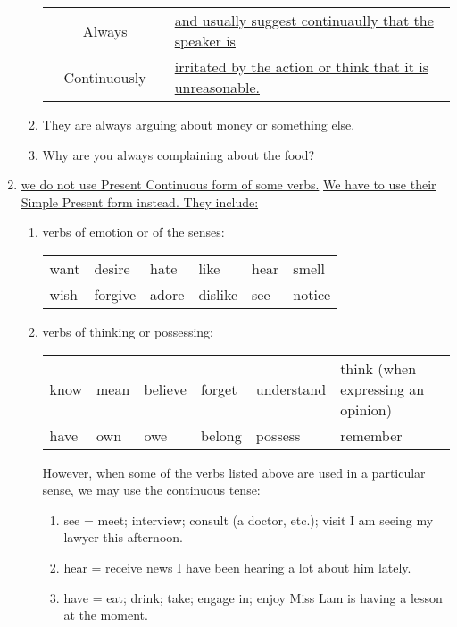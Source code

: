 \begin{enumerate}
\begin{enumerate}
\begin{tabular}{cccl}
                    & Always       & & \underline{and usually suggest continuaully that the speaker is} \\
                    & Continuously & & \underline{irritated by the action or think that it is unreasonable.}
                \end{tabular}
            \item They are always arguing about money or something else.
            \item Why are you always complaining about the food?
        \end{enumerate}
    \item \underline{we do not use Present Continuous form of some verbs.} \newline
        \underline{We have to use their Simple Present form instead. They include:}
        \begin{enumerate}
            \item verbs of emotion or of the senses: \newline
                \begin{tabular}{llllll}
                    want & desire & hate & like & hear & smell \\
                    wish & forgive & adore & dislike & see & notice
                \end{tabular}
            \item verbs of thinking or possessing: \newline
                \begin{tabular}{llllll}
                    know & mean & believe & forget & understand & think (when expressing an opinion)\\
                    have & own & owe & belong & possess & remember
                \end{tabular} \newline
                However, when some of the verbs listed above are used in a
                particular sense, we may use the continuous tense:
                \begin{enumerate}
                    \item see = meet; interview; consult (a doctor, etc.); visit \newline
                        I am seeing my lawyer this afternoon.
                    \item hear = receive news \newline
                        I have been hearing a lot about him lately.
                    \item have = eat; drink; take; engage in; enjoy \newline
                        Miss Lam is having a lesson at the moment.
                \end{enumerate}
        \end{enumerate}
\end{enumerate}

